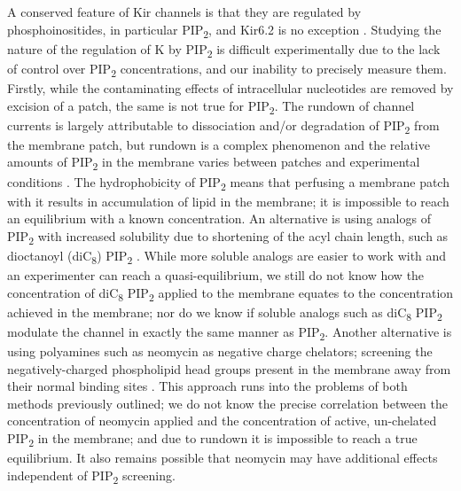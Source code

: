 A conserved feature of Kir channels is that they are regulated by phosphoinositides, in particular PIP\textsubscript{2}, and Kir6.2 is no exception \cite{hibino_inwardly_2010, fan_anionic_1997, shyng_membrane_1998, baukrowitz_pip2_1998}.
Studying the nature of the regulation of K\ATP{} by PIP\textsubscript{2} is difficult experimentally due to the lack of control over PIP\textsubscript{2} concentrations, and our inability to precisely measure them.
Firstly, while the contaminating effects of intracellular nucleotides are removed by excision of a patch, the same is not true for PIP\textsubscript{2}.
The rundown of channel currents is largely attributable to dissociation and/or degradation of PIP\textsubscript{2} from the membrane patch, but rundown is a complex phenomenon and the relative amounts of PIP\textsubscript{2} in the membrane varies between patches and experimental conditions \cite{proks_running_2016-2}.
The hydrophobicity of PIP\textsubscript{2} means that perfusing a membrane patch with it results in accumulation of lipid in the membrane; it is impossible to reach an equilibrium with a known concentration.
An alternative is using analogs of PIP\textsubscript{2} with increased solubility due to shortening of the acyl chain length, such as dioctanoyl (diC\textsubscript{8}) PIP\textsubscript{2} \cite{rohacs_specificity_2003}.
While more soluble analogs are easier to work with and an experimenter can reach a quasi-equilibrium, we still do not know how the concentration of diC\textsubscript{8} PIP\textsubscript{2} applied to the membrane equates to the concentration achieved in the membrane; nor do we know if soluble analogs such as diC\textsubscript{8} PIP\textsubscript{2} modulate the channel in exactly the same manner as PIP\textsubscript{2}.
Another alternative is using polyamines such as neomycin as negative charge chelators; screening the negatively-charged phospholipid head groups present in the membrane away from their normal binding sites \cite{fan_anionic_1997, schulze_phosphatidylinositol_2003}.
This approach runs into the problems of both methods previously outlined; we do not know the precise correlation between the concentration of neomycin applied and the concentration of active, un-chelated PIP\textsubscript{2} in the membrane; and due to rundown it is impossible to reach a true equilibrium.
It also remains possible that neomycin may have additional effects independent of PIP\textsubscript{2} screening.

